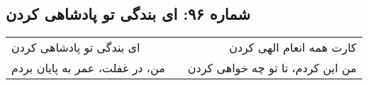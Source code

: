 \begin{center}
\section*{شماره ۹۶: ای بندگی تو پادشاهی کردن}
\label{sec:096}
\begin{longtable}{l p{0.5cm} r}
ای بندگی تو پادشاهی کردن
&&
کارت همه انعام الهی کردن
\\
من، در غفلت، عمر به پایان بردم
&&
من این کردم، تا تو چه خواهی کردن
\\
\end{longtable}
\end{center}
